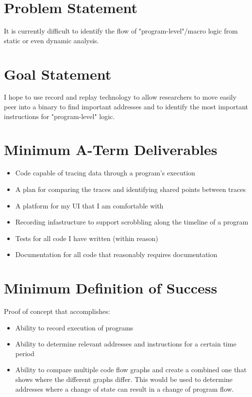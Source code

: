 \maketitle

\section{Problem Statement}

It is currently difficult to identify the flow of "program-level"/macro logic from static or even dynamic analysis. 

\section{Goal Statement}

I hope to use record and replay technology to allow researchers to move easily peer into a binary to find important addresses and to identify the most important instructions for "program-level" logic.

\section{Minimum A-Term Deliverables}

\begin{itemize}
    \item Code capable of tracing data through a program's execution 
    \item A plan for comparing the traces and identifying shared points between traces
    \item A platform for my UI that I am comfortable with
    \item Recording infastructure to support scrobbling along the timeline of a program
    \item Tests for all code I have written (within reason)
    \item Documentation for all code that reasonably requires documentation 
\end{itemize}

\section{Minimum Definition of Success}
Proof of concept that accomplishes:
\begin{itemize}
    \item Ability to record execution of programs
    \item Ability to determine relevant addresses and instructions for a certain time period
    \item Ability to compare multiple code flow graphs and create a combined one that shows where the different graphs differ. This would be used to determine addresses where a change of state can result in a change of program flow.
\end{itemize}


